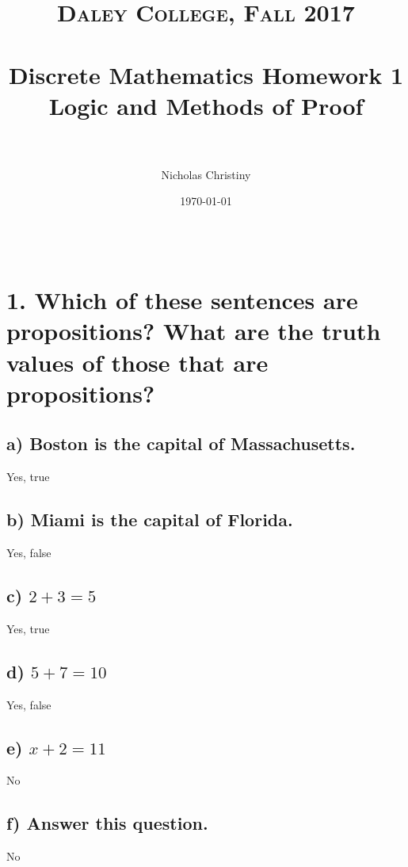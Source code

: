 \documentclass[11pt, oneside]{article} %
\title{	
\normalfont \normalsize 
\textsc{Daley College, Fall 2017} \\ [25pt] %
\horrule{0.5pt} \\[0.4cm] %
\huge Discrete Mathematics Homework 1 \\
\huge Logic and Methods of Proof \\ %
\horrule{2pt} \\[0.5cm] %
}
\author{Nicholas Christiny} %
\date{\normalsize\today} %
\numberwithin{equation}{section} %
\numberwithin{figure}{section} %
\begin{document}
\maketitle %

\section{ \\ 1. Which of these sentences are propositions? What are the truth values of those that are propositions?}




\subsection{a) Boston is the capital of Massachusetts.}
Yes, true
\subsection{b) Miami is the capital of Florida.}
Yes, false
\subsection{c) $2 + 3 = 5$}
Yes, true
\subsection{d) $5 + 7 = 10$}
Yes, false
\subsection{e) $x + 2 = 11$}
No
\subsection{f) Answer this question.}
No
\end{document}
